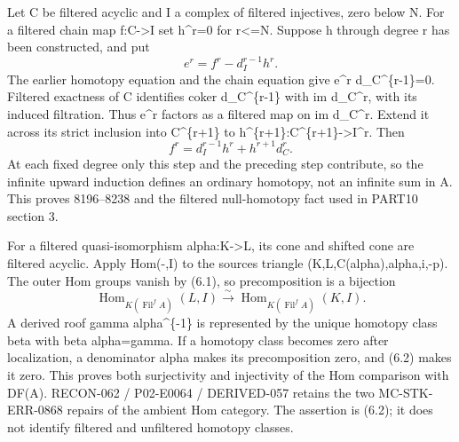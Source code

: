 Let C be filtered acyclic and I a complex of filtered injectives,\allowbreak{} zero below N. For a filtered chain map f:\allowbreak{}C\allowbreak{}->I set h\textasciicircum{}r\allowbreak{}=0 for r<\allowbreak{}=N. Suppose h through degree r has been constructed,\allowbreak{} and put \[
 e^r=f^r-d_I^{r-1}h^r.
\] The earlier homotopy equation and the chain equation give e\^{}r d\_\allowbreak{}C\textasciicircum{}\{r-1\}\allowbreak{}=0. Filtered exactness of C identifies coker d\_\allowbreak{}C\textasciicircum{}\{r-1\} with im d\_\allowbreak{}C\textasciicircum{}r,\allowbreak{} with its induced filtration. Thus e\^{}r factors as a filtered map on im d\_\allowbreak{}C\textasciicircum{}r. Extend it across its strict inclusion into C\textasciicircum{}\{r\allowbreak{}+1\} to h\textasciicircum{}\{r\allowbreak{}+1\}:\allowbreak{}C\textasciicircum{}\{r\allowbreak{}+1\}\allowbreak{}->I\textasciicircum{}r. Then \[
 f^r=d_I^{r-1}h^r+h^{r+1}d_C^r.                              \tag{6.1}
\] At each fixed degree only this step and the preceding step contribute,\allowbreak{} so the infinite upward induction defines an ordinary homotopy,\allowbreak{} not an infinite sum in A. This proves 8196–\allowbreak{}8238 and the filtered null-homotopy fact used in PART10 section 3.

For a filtered quasi-isomorphism alpha:\allowbreak{}K\allowbreak{}->L,\allowbreak{} its cone and shifted cone are filtered acyclic. Apply Hom(-,\allowbreak{}I)\allowbreak{} to the source\textquotesingle s triangle (K,\allowbreak{}L,\allowbreak{}C(alpha)\allowbreak{},\allowbreak{}alpha,\allowbreak{}i,\allowbreak{}-p)\allowbreak{}. The outer Hom groups vanish by (6.1)\allowbreak{},\allowbreak{} so precomposition is a bijection \[
 \operatorname{Hom}_{K(\operatorname{Fil}^f A)}(L,I)
 \xrightarrow{\sim}
 \operatorname{Hom}_{K(\operatorname{Fil}^f A)}(K,I).           \tag{6.2}
\] A derived roof gamma alpha\^{}\{-1\} is represented by the unique homotopy class beta with beta alpha\allowbreak{}=gamma. If a homotopy class becomes zero after localization,\allowbreak{} a denominator alpha makes its precomposition zero,\allowbreak{} and (6.2)\allowbreak{} makes it zero. This proves both surjectivity and injectivity of the Hom comparison with DF(A)\allowbreak{}. RECON-062 /\allowbreak{} P02-E0064 /\allowbreak{} DERIVED-057 retains the two MC-STK-ERR-0868 repairs of the ambient Hom category. The assertion is (6.2)\allowbreak{}; it does not identify filtered and unfiltered homotopy classes.


